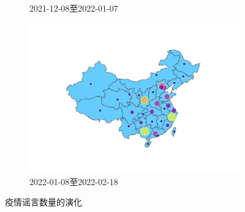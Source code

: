\documentclass[UTF8]{ctexart}
\begin{document}
\begin{figure}[!ht]
\begin{subfigure}[b]{0.3\textwidth}
         \caption{2021-12-08至2022-01-07}
         \label{subfig:covid_rumor_num_choropleth_1}
     \end{subfigure}
     \hfill
     \begin{subfigure}[b]{0.3\textwidth}
         \centering
         \includegraphics[width=\textwidth]{../figures/covid_rumor_num_choropleth_2}
         \caption{2022-01-08至2022-02-18}
         \label{subfig:covid_rumor_num_choropleth_2}
     \end{subfigure}
    \caption{疫情谣言数量的演化}
    \label{fig:covid_rumor_num_evolution}
\end{figure}
\end{document}
